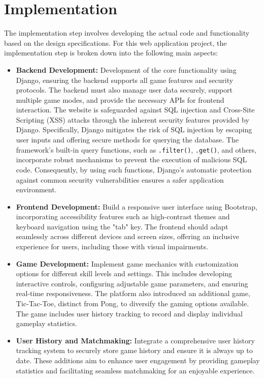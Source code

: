 \section{Implementation}
The implementation step involves developing the actual code and functionality based on the design specifications. For this web application project, the implementation step is broken down into the following main aspects:
\begin{itemize}
    \item \textbf{Backend Development:} Development of the core functionality using Django, ensuring the backend supports all game features and security protocols. The backend must also manage user data securely, support multiple game modes, and provide the necessary APIs for frontend interaction. The website is safeguarded against SQL injection and Cross-Site Scripting (XSS) attacks through the inherent security features provided by Django. Specifically, Django mitigates the risk of SQL injection by escaping user inputs and offering secure methods for querying the database. The framework's built-in query functions, such as \texttt{.filter()}, \texttt{.get()}, and others, incorporate robust mechanisms to prevent the execution of malicious SQL code. Consequently, by using such functions, Django's automatic protection against common security vulnerabilities ensures a safer application environment.
    \item \textbf{Frontend Development:} Build a responsive user interface using Bootstrap, incorporating accessibility features such as high-contrast themes and keyboard navigation using the "tab" key. The frontend should adapt seamlessly across different devices and screen sizes, offering an inclusive experience for users, including those with visual impairments.
    \item \textbf{Game Development:} Implement game mechanics with customization options for different skill levels and settings. This includes developing interactive controls, configuring adjustable game parameters, and ensuring real-time responsiveness. The platform also introduced an additional game, Tic-Tac-Toe, distinct from Pong, to diversify the gaming options available. The game includes user history tracking to record and display individual gameplay statistics.
    \item \textbf{User History and Matchmaking:} Integrate a comprehensive user history tracking system to securely store game history and ensure it is always up to date. These additions aim to enhance user engagement by providing gameplay statistics and facilitating seamless matchmaking for an enjoyable experience.

\end{itemize}
